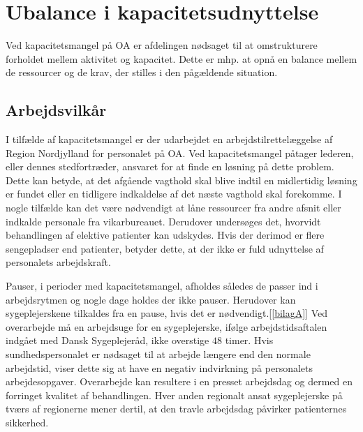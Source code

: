 \section{Ubalance i kapacitetsudnyttelse}
Ved kapacitetsmangel på OA er afdelingen nødsaget til at omstrukturere forholdet mellem aktivitet og kapacitet. Dette er mhp. at opnå en balance mellem de ressourcer og de krav, der stilles i den pågældende situation.\cite{Bjerg2016} %

\subsection{Arbejdsvilkår} \label{Per_sik}

I tilfælde af kapacitetsmangel er der udarbejdet en arbejdstilrettelæggelse af Region Nordjylland for personalet på OA. Ved kapacitetsmangel påtager lederen, eller dennes stedfortræder, ansvaret for at finde en løsning på dette problem. Dette kan betyde, at det afgående vagthold skal blive indtil en midlertidig løsning er fundet eller en tidligere indkaldelse af det næste vagthold skal forekomme. I nogle tilfælde kan det være nødvendigt at låne ressourcer fra andre afsnit eller indkalde personale fra vikarbureauet. Derudover undersøges det, hvorvidt behandlingen af elektive patienter kan udskydes.\cite{Bjerg2016} 
Hvis der derimod er flere sengepladser end patienter, betyder dette, at der ikke er fuld udnyttelse af personalets arbejdskraft.

Pauser, i perioder med kapacitetsmangel, afholdes således de passer ind i arbejdsrytmen og nogle dage holdes der ikke pauser. Herudover kan sygeplejerskene tilkaldes fra en pause, hvis det er nødvendigt.[\ref{bilagA}] Ved overarbejde må en arbejdsuge for en sygeplejerske, ifølge arbejdstidsaftalen indgået med Dansk Sygeplejeråd, ikke overstige $48$ timer. Hvis sundhedspersonalet er nødsaget til at arbejde længere end den normale arbejdstid, viser dette sig at have en negativ indvirkning på personalets arbejdesopgaver\cite{Dinges2004}. Overarbejde kan resultere i en presset arbejdsdag og dermed en forringet kvalitet af behandlingen. Hver anden regionalt ansat sygeplejerske på tværs af regionerne mener dertil, at den travle arbejdsdag påvirker patienternes sikkerhed.\cite{Kjeldsen2015}


